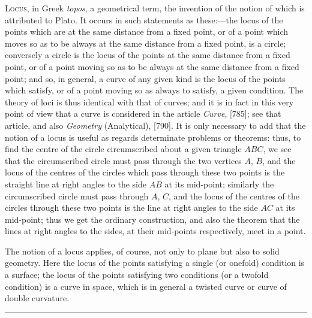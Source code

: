 \documentclass[11pt,a4paper]{article}
\begin{document}

\smallskip

\textsc{Locus,} in Greek \textit{topos}, a geometrical term, the invention of the notion of which is attributed to Plato. It occurs in such statements as these:---the locus of the points which are at the same distance from a fixed point, or of a point which moves so as to be always at the same distance from a fixed point, is a circle; conversely a circle is the locus of the points at the same distance from a fixed point, or of a point moving so as to be always at the same distance from a fixed point; and so, in general, a curve of any given kind is the locus of the points which satisfy, or of a point moving so as always to satisfy, a given condition. The theory of loci is thus identical with that of curves; and it is in fact in this very point of view that a curve is considered in the article \textit{Curve}, [785]; see that article, and also \textit{Geometry} (Analytical), [790]. It is only necessary to add that the notion of a locus is useful as regards determinate problems or theorems: thus, to find the centre of the circle circumscribed about a given triangle $ABC$, we see that the circumscribed circle must pass through the two vertices $A$, $B$, and the locus of the centres of the circles which pass through these two points is the straight line at right angles to the side $AB$ at its mid-point; similarly the circumscribed circle must pass through $A$, $C$, and the locus of the centres of the circles through these two points is the line at right angles to the side $AC$ at its mid-point; thus we get the ordinary construction, and also the theorem that the lines at right angles to the sides, at their mid-points respectively, meet in a point.

The notion of a locus applies, of course, not only to plane but also to solid geometry. Here the locus of the points satisfying a single (or onefold) condition is a surface; the locus of the points satisfying two conditions (or a twofold condition) is a curve in space, which is in general a twisted curve or curve of double curvature.

\vspace{1em}
\hrule
\vspace{1em}


\end{document}

